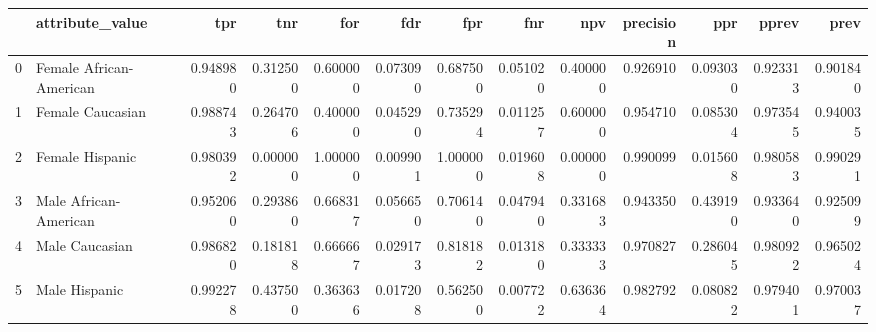 \begin{tabular}{llrrrrrrrrrrr}
\toprule
{} &          attribute\_value &       tpr &       tnr &       for &       fdr &       fpr &       fnr &       npv &  precision &       ppr &     pprev &      prev \\
\midrule
0 &  Female African-American &  0.948980 &  0.312500 &  0.600000 &  0.073090 &  0.687500 &  0.051020 &  0.400000 &   0.926910 &  0.093030 &  0.923313 &  0.901840 \\
1 &         Female Caucasian &  0.988743 &  0.264706 &  0.400000 &  0.045290 &  0.735294 &  0.011257 &  0.600000 &   0.954710 &  0.085304 &  0.973545 &  0.940035 \\
2 &          Female Hispanic &  0.980392 &  0.000000 &  1.000000 &  0.009901 &  1.000000 &  0.019608 &  0.000000 &   0.990099 &  0.015608 &  0.980583 &  0.990291 \\
3 &    Male African-American &  0.952060 &  0.293860 &  0.668317 &  0.056650 &  0.706140 &  0.047940 &  0.331683 &   0.943350 &  0.439190 &  0.933640 &  0.925099 \\
4 &           Male Caucasian &  0.986820 &  0.181818 &  0.666667 &  0.029173 &  0.818182 &  0.013180 &  0.333333 &   0.970827 &  0.286045 &  0.980922 &  0.965024 \\
5 &            Male Hispanic &  0.992278 &  0.437500 &  0.363636 &  0.017208 &  0.562500 &  0.007722 &  0.636364 &   0.982792 &  0.080822 &  0.979401 &  0.970037 \\
\bottomrule
\end{tabular}
